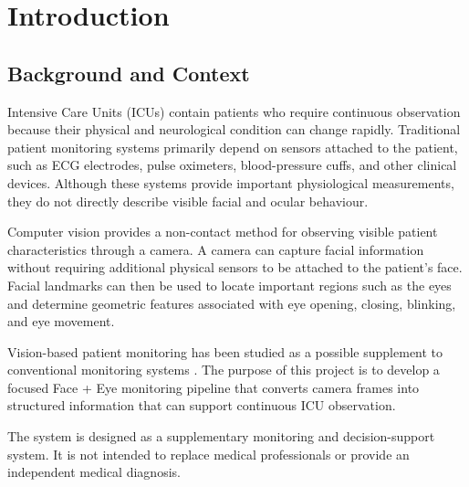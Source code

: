 \documentclass[12pt]{tietreport}
\author{
    \texttt{1024240103} Pahul Singh\\
    \texttt{1024240039} Harjot Singh
}
\begin{document}
\maketitle


\tableofcontents

\newpage


\chapter{Introduction}

\section{Background and Context}

Intensive Care Units (ICUs) contain patients who require continuous
observation because their physical and neurological condition can
change rapidly. Traditional patient monitoring systems primarily
depend on sensors attached to the patient, such as ECG electrodes,
pulse oximeters, blood-pressure cuffs, and other clinical devices.
Although these systems provide important physiological measurements,
they do not directly describe visible facial and ocular behaviour.

Computer vision provides a non-contact method for observing visible
patient characteristics through a camera. A camera can capture facial
information without requiring additional physical sensors to be
attached to the patient's face. Facial landmarks can then be used to
locate important regions such as the eyes and determine geometric
features associated with eye opening, closing, blinking, and eye
movement.

Vision-based patient monitoring has been studied as a possible
supplement to conventional monitoring systems
\cite{bevilacqua2016visionreview,davoudi2019intelligenticu}.
The purpose of this project is to develop a focused Face + Eye
monitoring pipeline that converts camera frames into structured
information that can support continuous ICU observation.

The system is designed as a supplementary monitoring and
decision-support system. It is not intended to replace medical
professionals or provide an independent medical diagnosis.
\end{document}
